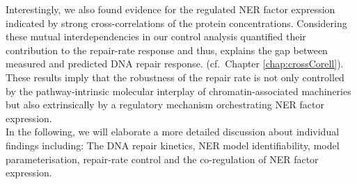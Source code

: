 Interestingly, we also found evidence for the regulated NER factor expression indicated by strong cross-correlations of the protein concentrations. Considering these mutual interdependencies in our control analysis quantified their contribution to the repair-rate response and thus, explains the gap between measured and predicted DNA repair response. (cf.\ Chapter \ref{chap:crossCorell}). These results imply that the robustness of the repair rate is not only controlled by the pathway-intrinsic molecular interplay of chromatin-associated machineries but also extrinsically by a regulatory mechanism orchestrating NER factor expression.\\
In the following, we will elaborate a more detailed discussion about individual findings including: The DNA repair kinetics, NER model identifiability, model parameterisation, repair-rate control and the co-regulation of NER factor expression.     
%
%

